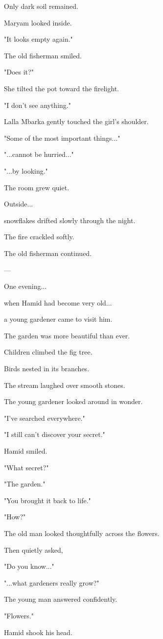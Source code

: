 \documentclass[12pt,openany]{book}
\begin{document}
Only dark soil remained.

Maryam looked inside.

"It looks empty again."

The old fisherman smiled.

"Does it?"

She tilted the pot toward the firelight.

"I don't see anything."

Lalla Mbarka gently touched the girl's shoulder.

"Some of the most important things..."

"...cannot be hurried..."

"...by looking."

The room grew quiet.

Outside...

snowflakes drifted slowly through the night.

The fire crackled softly.

The old fisherman continued.

---

One evening...

when Hamid had become very old...

a young gardener came to visit him.

The garden was more beautiful than ever.

Children climbed the fig tree.

Birds nested in its branches.

The stream laughed over smooth stones.

The young gardener looked around in wonder.

"I've searched everywhere."

"I still can't discover your secret."

Hamid smiled.

"What secret?"

"The garden."

"You brought it back to life."

"How?"

The old man looked thoughtfully across the flowers.

Then quietly asked,

"Do you know..."

"...what gardeners really grow?"

The young man answered confidently.

"Flowers."

Hamid shook his head.
\end{document}
